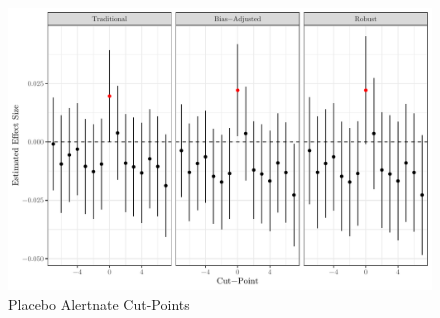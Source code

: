 \documentclass[
  12pt,
]{article}
\begin{document}
\begin{figure}[!ht]

{\centering \includegraphics{si_files/figure-latex/placebo-cuts-1} 

}

\caption{\label{fig:cutpoint}Placebo Alertnate Cut-Points}\label{fig:placebo-cuts}
\end{figure}
\end{document}
